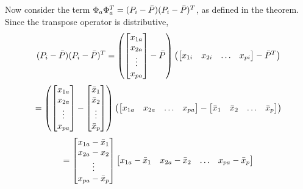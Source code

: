 \documentclass[12pt]{report}
\begin{document}
\begin{myproof}
                
                Now consider the term $\Phi_a \Phi_a^T = (P_i - \bar{P}) (P_i - \bar{P})^T$, as defined in the theorem. Since the transpose operator is distributive,
                    \[
                        (P_i - \bar{P}) (P_i - \bar{P})^T =
                            \left(
                                \begin{bmatrix}
                                    x_{1a} \\
                                    x_{2a} \\
                                    \vdots \\
                                    x_{pa}
                                \end{bmatrix} - \bar{P}
                            \right) \left(
                                \begin{bmatrix}
                                    x_{1i} & x_{2i} & \dotsc & x_{pi}
                                \end{bmatrix} - \bar{P}^T
                            \right)
                    \]
                    \[
                        =
                            \left(
                                \begin{bmatrix}
                                    x_{1a} \\
                                    x_{2a} \\
                                    \vdots \\
                                    x_{pa}
                                \end{bmatrix} - \begin{bmatrix}
                                    \bar{x}_1 \\
                                    \bar{x}_2\\
                                    \vdots \\
                                    \bar{x}_p
                                \end{bmatrix}
                            \right) \left(
                                \begin{bmatrix}
                                    x_{1a} & x_{2a} & \dotsc & x_{pa}
                                \end{bmatrix} - \begin{bmatrix}
                                    \bar{x}_1 & \bar{x}_2 & \dotsc & \bar{x}_p
                                \end{bmatrix}
                            \right)
                    \]
                    \[
                        =
                            \begin{bmatrix}
                                x_{1a} - \bar{x}_1 \\
                                x_{2a} - x_2 \\
                                \vdots \\
                                x_{pa} - \bar{x}_p
                            \end{bmatrix}
                            \begin{bmatrix}
                                x_{1a} - \bar{x}_1 & x_{2a} - \bar{x}_2 & \dotsc & x_{pa} -\bar{x}_p
                            \end{bmatrix}
                    \]
                

\end{myproof}
\end{document}
